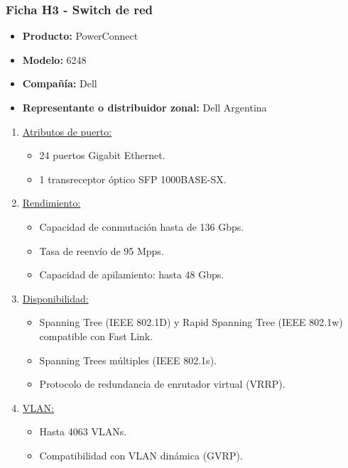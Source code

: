 \subsubsection{Ficha H3 - Switch de red}

\begin{itemize}
  \item \textbf{Producto:} PowerConnect
  \item \textbf{Modelo:} 6248
  \item \textbf{Compañía:} Dell
  \item \textbf{Representante o distribuidor zonal:} Dell Argentina
\end{itemize}

\begin{enumerate}

\item \underline{Atributos de puerto:}
\begin{itemize}
  \item 24 puertos Gigabit Ethernet.
  \item 1 transreceptor óptico SFP 1000BASE-SX.
\end{itemize}

\item \underline{Rendimiento:}
\begin{itemize}
  \item Capacidad de conmutación hasta de 136 Gbps.
  \item Tasa de reenvío de 95 Mpps.
  \item Capacidad de apilamiento: hasta 48 Gbps.
\end{itemize}

\item \underline{Disponibilidad:}
\begin{itemize}
  \item Spanning Tree (IEEE 802.1D) y Rapid Spanning Tree (IEEE 802.1w) compatible con Fast Link.
  \item Spanning Trees múltiples (IEEE 802.1s).
  \item Protocolo de redundancia de enrutador virtual (VRRP).
\end{itemize}

\item \underline{VLAN:}
\begin{itemize}
  \item Hasta 4063 VLANs.
  \item Compatibilidad con VLAN dinámica (GVRP).
\end{itemize}


\end{enumerate}
